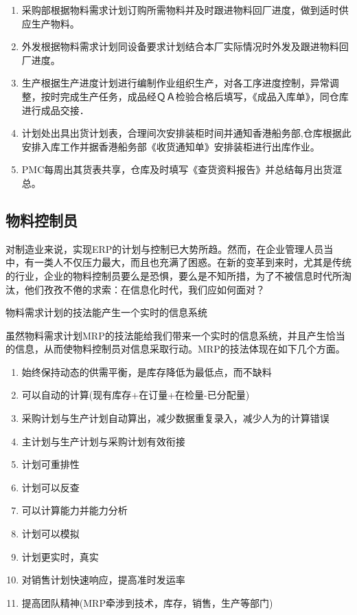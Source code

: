\begin{enumerate}
        \item  采购部根据物料需求计划订购所需物料并及时跟进物料回厂进度，做到适时供应生产物料。
        \item  外发根据物料需求计划同设备要求计划结合本厂实际情况时外发及跟进物料回厂进度。
        \item  生产根据生产进度计划进行编制作业组织生产，对各工序进度控制，异常调整，按时完成生产任务，成品经ＱＡ检验合格后填写，《成品入库单》，同仓库进行成品交接．
        \item  计划处出具出货计划表，合理间次安排装柜时间并通知香港船务部,仓库根据此安排入库工作并据香港船务部《收货通知单》安排装柜进行出库作业。
        \item  PMC每周出其货表共享，仓库及时填写《查货资料报告》并总结每月出货洭总。
    \end{enumerate}


\subsection {物料控制员}

    对制造业来说，实现ERP的计划与控制已大势所趋。然而，在企业管理人员当中，有一类人不仅压力最大，而且也充满了困惑。在新的变革到来时，尤其是传统的行业，企业的物料控制员要么是恐惧，要么是不知所措，为了不被信息时代所淘汰，他们孜孜不倦的求索：在信息化时代，我们应如何面对？

    物料需求计划的技法能产生一个实时的信息系统

    虽然物料需求计划MRP的技法能给我们带来一个实时的信息系统，并且产生恰当的信息，从而使物料控制员对信息采取行动。MRP的技法体现在如下几个方面。

    \begin{enumerate}
        \item  始终保持动态的供需平衡，是库存降低为最低点，而不缺料
        \item  可以自动的计算(现有库存+在订量+在检量-已分配量)
        \item  采购计划与生产计划自动算出，减少数据重复录入，减少人为的计算错误
        \item  主计划与生产计划与采购计划有效衔接
        \item  计划可重排性
        \item  计划可以反查
        \item  可以计算能力并能力分析
        \item  计划可以模拟
        \item  计划更实时，真实
        \item  对销售计划快速响应，提高准时发运率
        \item  提高团队精神(MRP牵涉到技术，库存，销售，生产等部门)
    \end{enumerate}

